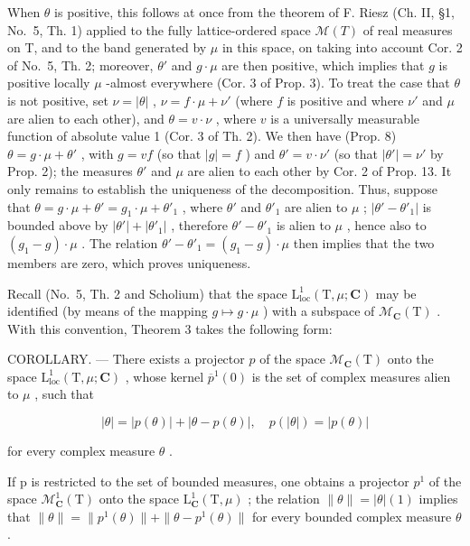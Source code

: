 When \(\theta\) is positive, this follows at once from the theorem of F. Riesz (Ch. II, §1, No.~5, Th. 1) applied to the fully lattice-ordered space \(\mathcal{M}(T)\) of real measures on T, and to the band generated by \(\mu\) in this space, on taking into account Cor. 2 of No.~5, Th. 2; moreover, \(\theta'\) and \(g \cdot \mu\) are then positive, which implies that \(g\) is positive locally \(\mu\) -almost everywhere (Cor. 3 of Prop. 3). To treat the case that \(\theta\) is not positive, set \(\nu = |\theta|\) , \(\nu = f \cdot \mu + \nu'\) (where \(f\) is positive and where \(\nu'\) and \(\mu\) are alien to each other), and \(\theta = v \cdot \nu\) , where \(v\) is a universally measurable function of absolute value 1 (Cor. 3 of Th. 2). We then have (Prop. 8) \(\theta = g \cdot \mu + \theta'\) , with \(g = vf\) (so that \(|g| = f\) ) and \(\theta' = v \cdot \nu'\) (so that \(|\theta'| = \nu'\) by Prop. 2); the measures \(\theta'\) and \(\mu\) are alien to each other by Cor. 2 of Prop. 13. It only remains to establish the uniqueness of the decomposition. Thus, suppose that \(\theta = g \cdot \mu + \theta' = g_1 \cdot \mu + \theta'_1\) , where \(\theta'\) and \(\theta'_1\) are alien to \(\mu\) ; \(|\theta' - \theta'_1|\) is bounded above by \(|\theta'| + |\theta'_1|\) , therefore \(\theta' - \theta'_1\) is alien to \(\mu\) , hence also to \((g_1 - g) \cdot \mu\) . The relation \(\theta' - \theta'_1 = (g_1 - g) \cdot \mu\) then implies that the two members are zero, which proves uniqueness.

Recall (No.~5, Th. 2 and Scholium) that the space \(\mathrm{L}_{\mathrm{loc}}^{1}(\mathrm{T},\mu;\mathbf{C})\) may be identified (by means of the mapping \(g\mapsto g\cdot\mu\) ) with a subspace of \(\mathcal{M}_{\mathbf{C}}(\mathrm{T})\) . With this convention, Theorem 3 takes the following form:

COROLLARY. --- There exists a projector \(p\) of the space \(\mathcal{M}_{\mathbf{C}}(\mathrm{T})\) onto the space \(\mathrm{L}_{\mathrm{loc}}^{1}(\mathrm{T},\mu ;\mathbf{C})\) , whose kernel \(\overline{p}^{1}(0)\) is the set of complex measures alien to \(\mu\) , such that

\[
| \theta | = | p (\theta) | + | \theta - p (\theta) |, \quad p (| \theta |) = | p (\theta) |
\]

for every complex measure \(\theta\) .

If p is restricted to the set of bounded measures, one obtains a projector \(p^{1}\) of the space \(\mathcal{M}_{\mathbf{C}}^{1}(\mathrm{T})\) onto the space \(\mathrm{L}_{\mathbf{C}}^{1}(\mathrm{T},\mu)\) ; the relation \(\|\theta\|=|\theta|(1)\) implies that \(\|\theta\|=\|p^{1}(\theta)\|+\|\theta-p^{1}(\theta)\|\) for every bounded complex measure \(\theta\) .

